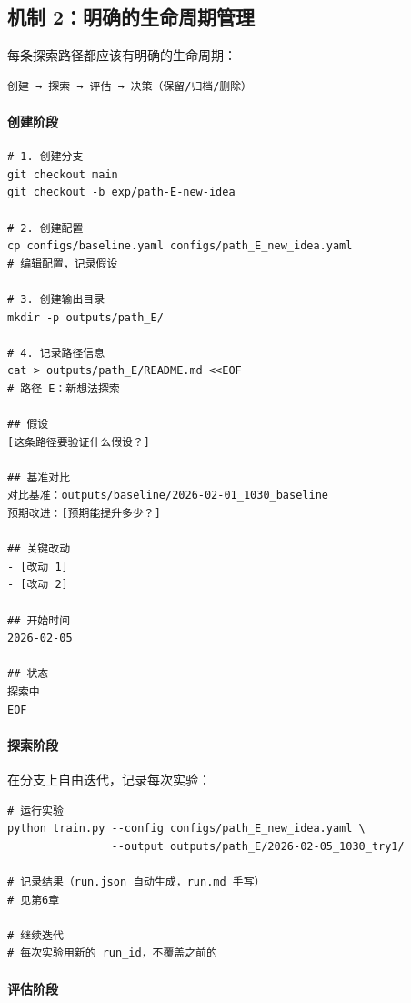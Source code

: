 \subsection{机制 2：明确的生命周期管理}

每条探索路径都应该有明确的生命周期：

\begin{verbatim}
创建 → 探索 → 评估 → 决策（保留/归档/删除）
\end{verbatim}

\paragraph{创建阶段}

\begin{verbatim}
# 1. 创建分支
git checkout main
git checkout -b exp/path-E-new-idea

# 2. 创建配置
cp configs/baseline.yaml configs/path_E_new_idea.yaml
# 编辑配置，记录假设

# 3. 创建输出目录
mkdir -p outputs/path_E/

# 4. 记录路径信息
cat > outputs/path_E/README.md <<EOF
# 路径 E：新想法探索

## 假设
[这条路径要验证什么假设？]

## 基准对比
对比基准：outputs/baseline/2026-02-01_1030_baseline
预期改进：[预期能提升多少？]

## 关键改动
- [改动 1]
- [改动 2]

## 开始时间
2026-02-05

## 状态
探索中
EOF
\end{verbatim}

\paragraph{探索阶段}

在分支上自由迭代，记录每次实验：
\begin{verbatim}
# 运行实验
python train.py --config configs/path_E_new_idea.yaml \
                --output outputs/path_E/2026-02-05_1030_try1/

# 记录结果（run.json 自动生成，run.md 手写）
# 见第6章

# 继续迭代
# 每次实验用新的 run_id，不覆盖之前的
\end{verbatim}

\paragraph{评估阶段}

